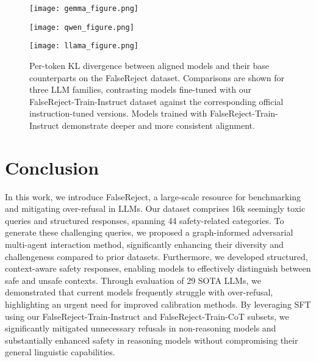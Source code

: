 \documentclass{article} %
\begin{document}
\begin{figure}[H]
  \centering
  \vspace{-0.3cm}
  \begin{minipage}[t]{0.325\textwidth}
    \centering
    \texttt{[image: gemma\_figure.png]}
  \end{minipage}\hfill
  \begin{minipage}[t]{0.325\textwidth}
    \centering
    \texttt{[image: qwen\_figure.png]}
  \end{minipage}\hfill
  \begin{minipage}[t]{0.325\textwidth}
    \centering
    \texttt{[image: llama\_figure.png]}
  \end{minipage}
  \vspace{-0.4cm}
  \caption{\small{Per-token KL divergence between aligned models and their base counterparts on the FalseReject dataset. Comparisons are shown for three LLM families, contrasting models fine-tuned with our FalseReject-Train-Instruct dataset against the corresponding official instruction-tuned versions. Models trained with FalseReject-Train-Instruct demonstrate deeper and more consistent alignment.}}
  \label{fig:analysis}
\end{figure}



\section{Conclusion}
In this work, we introduce FalseReject, a large-scale resource for benchmarking and mitigating over-refusal in LLMs. Our dataset comprises 16k seemingly toxic queries and structured responses, spanning 44 safety-related categories. To generate these challenging queries, we proposed a graph-informed adversarial multi-agent interaction method, significantly enhancing their diversity and challengeness compared to prior datasets. Furthermore, we developed structured, context-aware safety responses, enabling models to effectively distinguish between safe and unsafe contexts. Through evaluation of 29 SOTA LLMs, we demonstrated that current models frequently struggle with over-refusal, highlighting an urgent need for improved calibration methods. By leveraging  SFT using our FalseReject-Train-Instruct and FalseReject-Train-CoT subsets, we significantly mitigated unnecessary refusals in non-reasoning models and substantially enhanced safety in reasoning models without compromising their general linguistic capabilities.
\end{document}
